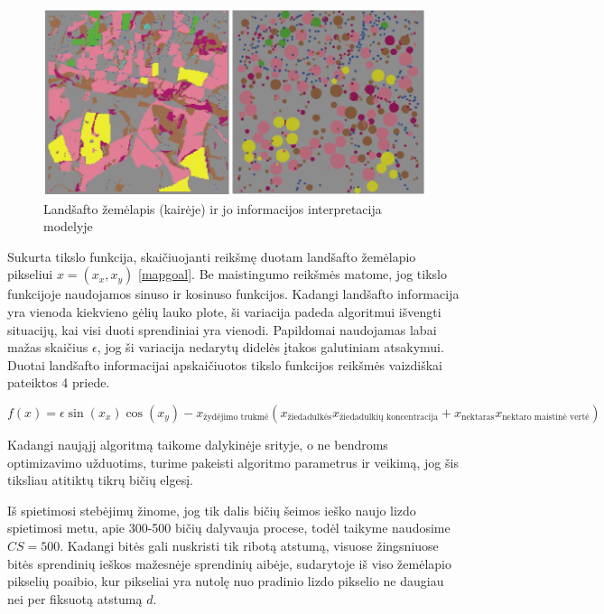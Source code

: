 \documentclass{VUMIFKompMagistrinis}
\begin{document}
\begin{figure}[H]
    \centering
    \includegraphics[scale=0.45]{img/new/maps.png}
    \caption{Landšafto žemėlapis (kairėje) ir jo informacijos interpretacija modelyje}
    \label{img:new1}
\end{figure}

Sukurta tikslo funkcija, skaičiuojanti reikšmę duotam landšafto žemėlapio pikseliui $x=(x_{x},x_{y})$ \eqref{mapgoal}. Be maistingumo reikšmės matome, jog tikslo funkcijoje naudojamos sinuso ir kosinuso funkcijos. Kadangi landšafto informacija yra vienoda kiekvieno gėlių lauko plote, ši variacija padeda algoritmui išvengti situacijų, kai visi duoti sprendiniai yra vienodi. Papildomai naudojamas labai mažas skaičius $\epsilon$, jog ši variacija nedarytų didelės įtakos galutiniam atsakymui. Duotai landšafto informacijai apskaičiuotos tikslo funkcijos reikšmės vaizdiškai pateiktos 4 priede. 

\begin{equation}\label{mapgoal}
f(x) = \epsilon\sin{(x_{x})}\cos{(x_{y})} - x_{\text{žydėjimo trukmė}}  (x_{\text{žiedadulkės}}x_{\text{žiedadulkių koncentracija}} + x_{\text{nektaras}}x_{\text{nektaro maistinė vertė}}) 
\end{equation}

Kadangi naująjį algoritmą taikome dalykinėje srityje, o ne bendroms optimizavimo užduotims, turime pakeisti algoritmo parametrus ir veikimą, jog šis tiksliau atitiktų tikrų bičių elgesį. 

Iš spietimosi stebėjimų \cite{See10} žinome, jog tik dalis bičių šeimos ieško naujo lizdo spietimosi metu, apie 300-500 bičių dalyvauja procese, todėl taikyme naudosime $CS=500$. Kadangi bitės gali nuskristi tik ribotą atstumą, visuose žingsniuose bitės sprendinių ieškos mažesnėje sprendinių aibėje, sudarytoje iš viso žemėlapio pikselių poaibio, kur pikseliai yra nutolę nuo pradinio lizdo pikselio ne daugiau nei per fiksuotą atstumą $d$.
\end{document}
